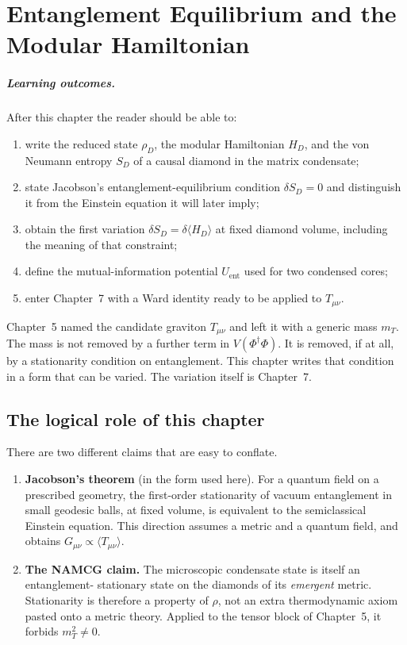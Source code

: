 \chapter[Entanglement equilibrium]{Entanglement Equilibrium and the Modular Hamiltonian}
\label{ch:entanglement-equilibrium}

\paragraph{Learning outcomes.}
After this chapter the reader should be able to:
\begin{enumerate}
  \item write the reduced state \(\rho_D\), the modular Hamiltonian
        \(H_D\), and the von Neumann entropy \(S_D\) of a causal
        diamond in the matrix condensate;
  \item state Jacobson's entanglement-equilibrium condition
        \(\delta S_D=0\) and distinguish it from the Einstein
        equation it will later imply;
  \item obtain the first variation \(\delta S_D=\delta\langle H_D\rangle\)
        at fixed diamond volume, including the meaning of that
        constraint;
  \item define the mutual-information potential \(U_{\mathrm{ent}}\)
        used for two condensed cores;
  \item enter Chapter~7 with a Ward identity ready to be applied to
        \(T_{\mu\nu}\).
\end{enumerate}

Chapter~5 named the candidate graviton \(T_{\mu\nu}\) and left it
with a generic mass \(m_T\). The mass is not removed by a further
term in \(V(\Phi^\dagger\Phi)\). It is removed, if at all, by a
stationarity condition on entanglement. This chapter writes that
condition in a form that can be varied. The variation itself is
Chapter~7.

\section{The logical role of this chapter}
\label{sec:ch6-role}

There are two different claims that are easy to conflate.

\begin{enumerate}
  \item \textbf{Jacobson's theorem} (in the form used here).
        For a quantum field on a prescribed geometry, the
        first-order stationarity of vacuum entanglement in small
        geodesic balls, at fixed volume, is equivalent to the
        semiclassical Einstein equation. This direction assumes a
        metric and a quantum field, and obtains \(G_{\mu\nu}\propto
        \langle T_{\mu\nu}\rangle\).
  \item \textbf{The NAMCG claim.}
        The microscopic condensate state is itself an entanglement-
        stationary state on the diamonds of its \emph{emergent}
        metric. Stationarity is therefore a property of \(\rho\),
        not an extra thermodynamic axiom pasted onto a metric theory.
        Applied to the tensor block of Chapter~5, it forbids
        \(m_T^2\neq 0\).
\end{enumerate}

